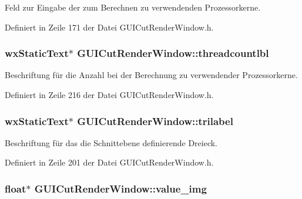 Feld zur Eingabe der zum Berechnen zu verwendenden Prozessorkerne. 



Definiert in Zeile 171 der Datei G\-U\-I\-Cut\-Render\-Window.\-h.

\hypertarget{classGUICutRenderWindow_a2797a52c219092ce3f54ea62ec4b95f3}{
\subsubsection[{threadcountlbl}]{\setlength{\rightskip}{0pt plus 5cm}wx\-Static\-Text$\ast$ G\-U\-I\-Cut\-Render\-Window\-::threadcountlbl\hspace{0.3cm}{\ttfamily [private]}}}\label{classGUICutRenderWindow_a2797a52c219092ce3f54ea62ec4b95f3}


Beschriftung für die Anzahl bei der Berechnung zu verwendender Prozessorkerne. 



Definiert in Zeile 216 der Datei G\-U\-I\-Cut\-Render\-Window.\-h.

\hypertarget{classGUICutRenderWindow_a1d6dae72dbc65725dee34799e7fb7af1}{
\subsubsection[{trilabel}]{\setlength{\rightskip}{0pt plus 5cm}wx\-Static\-Text$\ast$ G\-U\-I\-Cut\-Render\-Window\-::trilabel\hspace{0.3cm}{\ttfamily [private]}}}\label{classGUICutRenderWindow_a1d6dae72dbc65725dee34799e7fb7af1}


Beschriftung für das die Schnittebene definierende Dreieck. 



Definiert in Zeile 201 der Datei G\-U\-I\-Cut\-Render\-Window.\-h.

\hypertarget{classGUICutRenderWindow_a9c8338a733363aea25a8735d6873a414}{
\subsubsection[{value\-\_\-img}]{\setlength{\rightskip}{0pt plus 5cm}float$\ast$ G\-U\-I\-Cut\-Render\-Window\-::value\-\_\-img\hspace{0.3cm}{\ttfamily [private]}}}\label{classGUICutRenderWindow_a9c8338a733363aea25a8735d6873a414}


